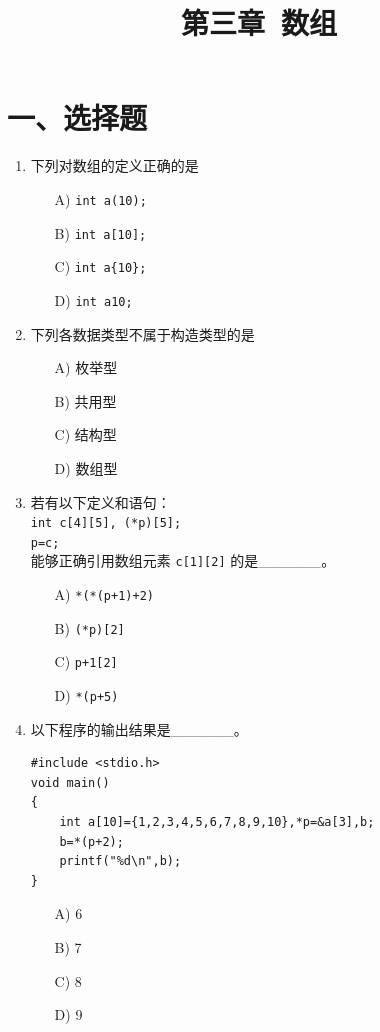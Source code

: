 \documentclass[a4paper,12pt]{article}
\title{\textbf{第三章\ 数组}}
\author{}
\date{}
\begin{document}
\maketitle

\section*{一、选择题}

\begin{enumerate}
	\item 下列对数组的定义正确的是
	      \begin{enumerate}
		      \item[A)] \texttt{int a(10);}
		      \item[B)] \texttt{int a[10];}
		      \item[C)] \texttt{int a\{10\};}
		      \item[D)] \texttt{int a10;}
	      \end{enumerate}
	      \vspace{0.3cm}

	\item 下列各数据类型不属于构造类型的是
	      \begin{enumerate}
		      \item[A)] 枚举型
		      \item[B)] 共用型
		      \item[C)] 结构型
		      \item[D)] 数组型
	      \end{enumerate}
	      \vspace{0.3cm}

	\item 若有以下定义和语句：\\
	      \texttt{int c[4][5], (*p)[5];}\\
	      \texttt{p=c;}\\
	      能够正确引用数组元素 \texttt{c[1][2]} 的是\_\_\_\_\_\_。
	      \begin{enumerate}
		      \item[A)] \texttt{*(*(p+1)+2)}
		      \item[B)] \texttt{(*p)[2]}
		      \item[C)] \texttt{p+1[2]}
		      \item[D)] \texttt{*(p+5)}
	      \end{enumerate}
	      \vspace{0.3cm}

	\item 以下程序的输出结果是\_\_\_\_\_\_。
	      \begin{verbatim}
#include <stdio.h>
void main()
{
    int a[10]={1,2,3,4,5,6,7,8,9,10},*p=&a[3],b;
    b=*(p+2);
    printf("%d\n",b);
}
    \end{verbatim}
	      \begin{enumerate}
		      \item[A)] 6
		      \item[B)] 7
		      \item[C)] 8
		      \item[D)] 9
	      \end{enumerate}
	      \vspace{0.3cm}


\end{enumerate}
\end{document}
